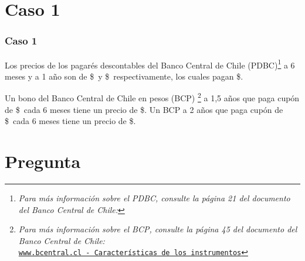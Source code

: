 \documentclass{beamer}
\begin{document}
\section{Caso 1}
\begin{frame}
    
  \frametitle{Caso 1}

  Los precios de los pagarés descontables del Banco Central de Chile (PDBC)\footnote{\textit{Para 
  más información sobre el PDBC, consulte la página 21 del documento del Banco Central de Chile:}}
  a 6 meses y a 1 año son de \$\Fseis\ y \$\Funo\, respectivamente, los cuales pagan \$\Nominal.
  \vspace{0.5em}
  
  
  Un bono del Banco Central de Chile en pesos (BCP) \footnote{\textit{Para más información sobre el BCP, 
  consulte la página 45 del documento del Banco Central de Chile:}\\
  \tiny{\href{https://www.bcentral.cl/contenido/-/detalle/caracteristicas-de-los-instrumentos-del-mercado-financiero-nacional-3}
  {\texttt{www.bcentral.cl - Características de los instrumentos}}}}
  a 1,5 años que paga cupón de  \$\CunoCinco\  cada 6 meses tiene un precio de \$\PunoCinco. 
  Un BCP a 2 años que paga
  cupón de \$\Cdos\ cada 6 meses tiene un precio de \$\Pdos.

  \end{frame}


\section{Pregunta }
\end{document}
